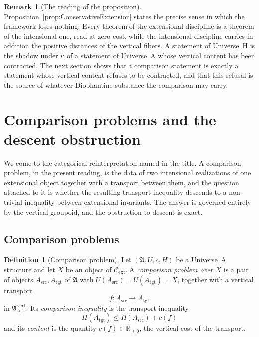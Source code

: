 \documentclass[10pt, reqno]{amsart}
\theoremstyle{plain}
\theoremstyle{definition}
\newtheorem{definition}[theorem]{Definition}
\newtheorem{remark}[theorem]{Remark}
\theoremstyle{plain}
\newcommand{\R}{\mathbb{R}}
\begin{document}
\begin{remark}[The reading of the proposition]\label{rem:readingConservative}
Proposition~\ref{prop:ConservativeExtension} states the precise sense in which the framework loses nothing. Every theorem of the extensional discipline is a theorem of the intensional one, read at zero cost, while the intensional discipline carries in addition the positive distances of the vertical fibers. A statement of Universe~H is the shadow under $\kappa$ of a statement of Universe~A whose vertical content has been contracted. The next section shows that a comparison statement is exactly a statement whose vertical content refuses to be contracted, and that this refusal is the source of whatever Diophantine substance the comparison may carry.
\end{remark}


\section{Comparison problems and the descent obstruction}\label{sec:Comparison}

We come to the categorical reinterpretation named in the title. A comparison problem, in the present reading, is the data of two intensional realizations of one extensional object together with a transport between them, and the question attached to it is whether the resulting transport inequality descends to a non-trivial inequality between extensional invariants. The answer is governed entirely by the vertical groupoid, and the obstruction to descent is exact.

\subsection{Comparison problems}

\begin{definition}[Comparison problem]\label{def:ComparisonProblem}
Let $(\mathfrak{A},U,c,H)$ be a Universe~A structure and let $X$ be an object of $\mathcal{C}_{\mathrm{ext}}$. A \emph{comparison problem over $X$} is a pair of objects $A_{\mathrm{src}}, A_{\mathrm{tgt}}$ of $\mathfrak{A}$ with $U(A_{\mathrm{src}}) = U(A_{\mathrm{tgt}}) = X$, together with a vertical transport
\[
  f \colon A_{\mathrm{src}} \longrightarrow A_{\mathrm{tgt}}
\]
in $\mathfrak{A}_X^{\mathrm{vert}}$. Its \emph{comparison inequality} is the transport inequality
\[
  H(A_{\mathrm{tgt}}) \le H(A_{\mathrm{src}}) + c(f)
\]
and its \emph{content} is the quantity $c(f) \in \R_{\ge 0}$, the vertical cost of the transport.
\end{definition}
\end{document}
